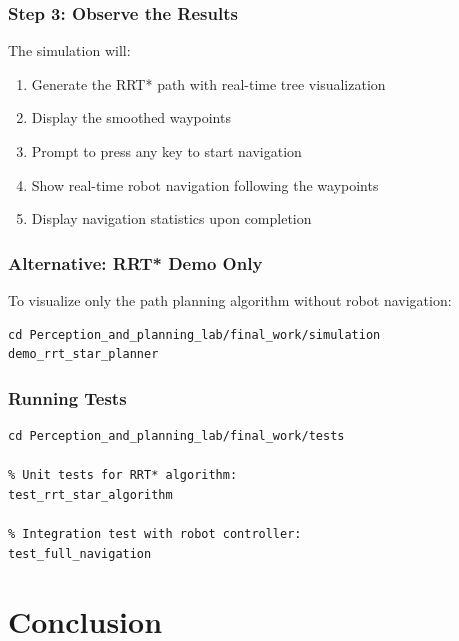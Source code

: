 \documentclass[12pt,a4paper]{scrartcl}
\begin{document}
	\subsubsection{Step 3: Observe the Results}
	
	The simulation will:
	\begin{enumerate}
		\item Generate the RRT* path with real-time tree visualization
		\item Display the smoothed waypoints
		\item Prompt to press any key to start navigation
		\item Show real-time robot navigation following the waypoints
		\item Display navigation statistics upon completion
	\end{enumerate}
	
	\subsubsection{Alternative: RRT* Demo Only}
	
	To visualize only the path planning algorithm without robot navigation:
	
	\begin{lstlisting}[style=matlabstyle,caption={Run RRT* demo}]
cd Perception_and_planning_lab/final_work/simulation
demo_rrt_star_planner
	\end{lstlisting}
	
	\subsubsection{Running Tests}
	
	\begin{lstlisting}[style=matlabstyle,caption={Execute tests}]
cd Perception_and_planning_lab/final_work/tests

% Unit tests for RRT* algorithm:
test_rrt_star_algorithm

% Integration test with robot controller:
test_full_navigation
	\end{lstlisting}
	
	\section{Conclusion}
	
\end{document}
